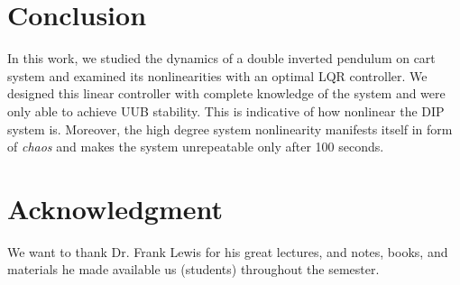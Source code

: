 \documentclass[journal]{IEEEtran}
\begin{document}



\section{Conclusion}
In this work, we studied the dynamics of a double inverted pendulum on cart
system and examined its nonlinearities with an optimal LQR controller. We
designed this linear controller with complete knowledge of the system and were
only able to achieve UUB stability.
This is indicative of how nonlinear the DIP system is.
Moreover, the high degree system nonlinearity manifests itself in form of
\emph{chaos} and makes the system unrepeatable only after 100 seconds.










\section*{Acknowledgment}
We want to thank Dr. Frank Lewis for his great lectures, and notes, books, and
materials he made available us (students) throughout the semester.







%
\end{document}
